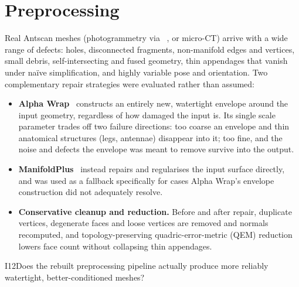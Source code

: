 \section{Preprocessing}
\label{sec:preprocessing}

Real Antscan meshes (photogrammetry via ~\cite{scant}, or
micro-CT) arrive with a wide range of defects: holes, disconnected
fragments, non-manifold edges and vertices, small debris, self-intersecting
and fused geometry, thin appendages that vanish under naïve simplification,
and highly variable pose and orientation. Two complementary repair
strategies were evaluated rather than assumed:

\begin{itemize}
\item \textbf{Alpha Wrap}~\cite{alphawrap} constructs an entirely new, watertight envelope
around the input geometry, regardless of how damaged the input is. Its
single scale parameter trades off two failure directions: too coarse an
envelope and thin anatomical structures (legs, antennae) disappear
into it; too fine, and the noise and defects the envelope was meant to
remove survive into the output.
\item \textbf{ManifoldPlus}~\cite{manifoldplus} instead repairs and regularises the input
surface directly, and was used as a fallback specifically for cases Alpha
Wrap's envelope construction did not adequately resolve.
\item \textbf{Conservative cleanup and reduction.} Before and after repair,
duplicate vertices, degenerate faces and loose vertices are removed and
normals recomputed, and topology-preserving quadric-error-metric (QEM)
reduction~\cite{qem} lowers face count without collapsing thin appendages.
\end{itemize}

\begin{investigation}{I12}{Does the rebuilt preprocessing pipeline actually
produce more reliably watertight, better-conditioned meshes?}
\end{investigation}

